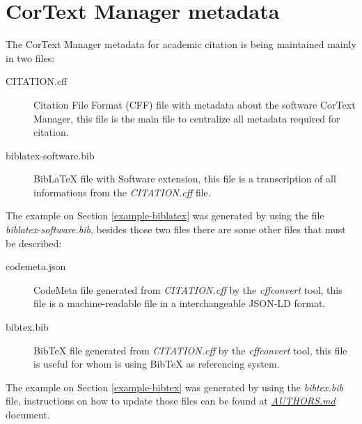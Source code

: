\documentclass{article}
\begin{document}
\section{CorText Manager metadata}

The CorText Manager metadata for academic citation is being maintained mainly in two files:

\begin{description}
  \item[CITATION.cff] Citation File Format (CFF) file with metadata about the software CorText Manager,
    this file is the main file to centralize all metadata required for citation.
  \item[biblatex-software.bib] BibLaTeX file with Software extension,
    this file is a transcription of all informations from the {\em CITATION.cff} file.
\end{description}

The example on Section \ref{example-biblatex} was generated by using the file
{\em biblatex-software.bib}, besides those two files there are some other
files that must be described:

\begin{description}
  \item[codemeta.json] CodeMeta file generated from {\em CITATION.cff} by the
    {\em cffconvert} tool, this file is a machine-readable file in a
    interchangeable JSON-LD format.
  \item[bibtex.bib] BibTeX file generated from {\em CITATION.cff} by the {\em
    cffconvert} tool, this file is useful for whom is using BibTeX as referencing
    system.
\end{description}

The example on Section \ref{example-bibtex} was generated by using the {\em
bibtex.bib} file, instructions on how to update those files can be found at
\href{https://github.com/cortext/how-to-cite-cortext/blob/main/AUTHORS.md}{\em AUTHORS.md}
document.
\end{document}
